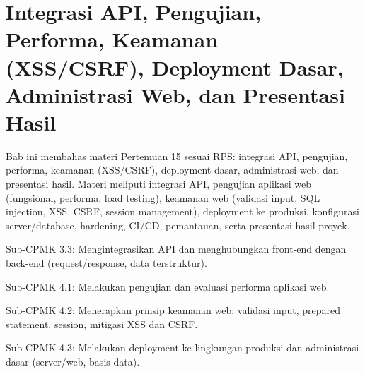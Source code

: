 \documentclass[../main.tex]{subfiles}
\begin{document}
\chapter{Integrasi API, Pengujian, Performa, Keamanan (XSS/CSRF), Deployment Dasar, Administrasi Web, dan Presentasi Hasil}

Bab ini membahas materi Pertemuan 15 sesuai RPS: integrasi API, pengujian, performa, keamanan (XSS/CSRF), deployment dasar, administrasi web, dan presentasi hasil. Materi meliputi integrasi API, pengujian aplikasi web (fungsional, performa, load testing), keamanan web (validasi input, SQL injection, XSS, CSRF, session management), deployment ke produksi, konfigurasi server/database, hardening, CI/CD, pemantauan, serta presentasi hasil proyek.

\begin{subcpmk}
  \item Sub-CPMK 3.3: Mengintegrasikan API dan menghubungkan front-end dengan back-end (request/response, data terstruktur).
  \item Sub-CPMK 4.1: Melakukan pengujian dan evaluasi performa aplikasi web.
  \item Sub-CPMK 4.2: Menerapkan prinsip keamanan web: validasi input, prepared statement, session, mitigasi XSS dan CSRF.
  \item Sub-CPMK 4.3: Melakukan deployment ke lingkungan produksi dan administrasi dasar (server/web, basis data).
\end{subcpmk}


































\end{document}
